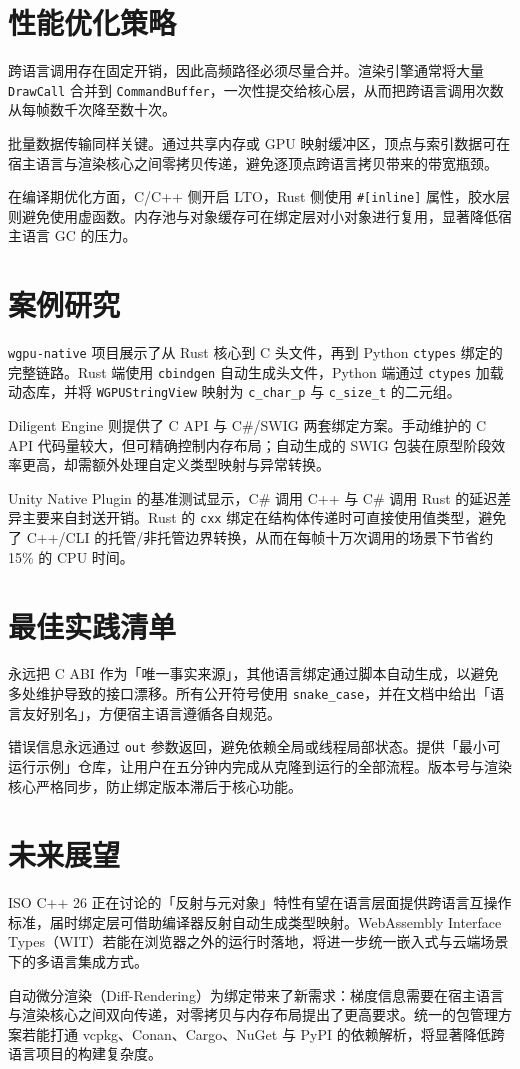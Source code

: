\chapter{性能优化策略}
跨语言调用存在固定开销，因此高频路径必须尽量合并。渲染引擎通常将大量 \texttt{DrawCall} 合并到 \texttt{CommandBuffer}，一次性提交给核心层，从而把跨语言调用次数从每帧数千次降至数十次。\par
批量数据传输同样关键。通过共享内存或 GPU 映射缓冲区，顶点与索引数据可在宿主语言与渲染核心之间零拷贝传递，避免逐顶点跨语言拷贝带来的带宽瓶颈。\par
在编译期优化方面，C/C++ 侧开启 LTO，Rust 侧使用 \texttt{\#{}[inline]} 属性，胶水层则避免使用虚函数。内存池与对象缓存可在绑定层对小对象进行复用，显著降低宿主语言 GC 的压力。\par
\chapter{案例研究}
\texttt{wgpu-native} 项目展示了从 Rust 核心到 C 头文件，再到 Python \texttt{ctypes} 绑定的完整链路。Rust 端使用 \texttt{cbindgen} 自动生成头文件，Python 端通过 \texttt{ctypes} 加载动态库，并将 \texttt{WGPUStringView} 映射为 \texttt{c\_{}char\_{}p} 与 \texttt{c\_{}size\_{}t} 的二元组。\par
Diligent Engine 则提供了 C API 与 C\#{}/SWIG 两套绑定方案。手动维护的 C API 代码量较大，但可精确控制内存布局；自动生成的 SWIG 包装在原型阶段效率更高，却需额外处理自定义类型映射与异常转换。\par
Unity Native Plugin 的基准测试显示，C\#{} 调用 C++ 与 C\#{} 调用 Rust 的延迟差异主要来自封送开销。Rust 的 \texttt{cxx} 绑定在结构体传递时可直接使用值类型，避免了 C++/CLI 的托管/非托管边界转换，从而在每帧十万次调用的场景下节省约 15\%{} 的 CPU 时间。\par
\chapter{最佳实践清单}
永远把 C ABI 作为「唯一事实来源」，其他语言绑定通过脚本自动生成，以避免多处维护导致的接口漂移。所有公开符号使用 \texttt{snake\_{}case}，并在文档中给出「语言友好别名」，方便宿主语言遵循各自规范。\par
错误信息永远通过 \texttt{out} 参数返回，避免依赖全局或线程局部状态。提供「最小可运行示例」仓库，让用户在五分钟内完成从克隆到运行的全部流程。版本号与渲染核心严格同步，防止绑定版本滞后于核心功能。\par
\chapter{未来展望}
ISO C++ 26 正在讨论的「反射与元对象」特性有望在语言层面提供跨语言互操作标准，届时绑定层可借助编译器反射自动生成类型映射。WebAssembly Interface Types（WIT）若能在浏览器之外的运行时落地，将进一步统一嵌入式与云端场景下的多语言集成方式。\par
自动微分渲染（Diff-Rendering）为绑定带来了新需求：梯度信息需要在宿主语言与渲染核心之间双向传递，对零拷贝与内存布局提出了更高要求。统一的包管理方案若能打通 vcpkg、Conan、Cargo、NuGet 与 PyPI 的依赖解析，将显著降低跨语言项目的构建复杂度。\par
